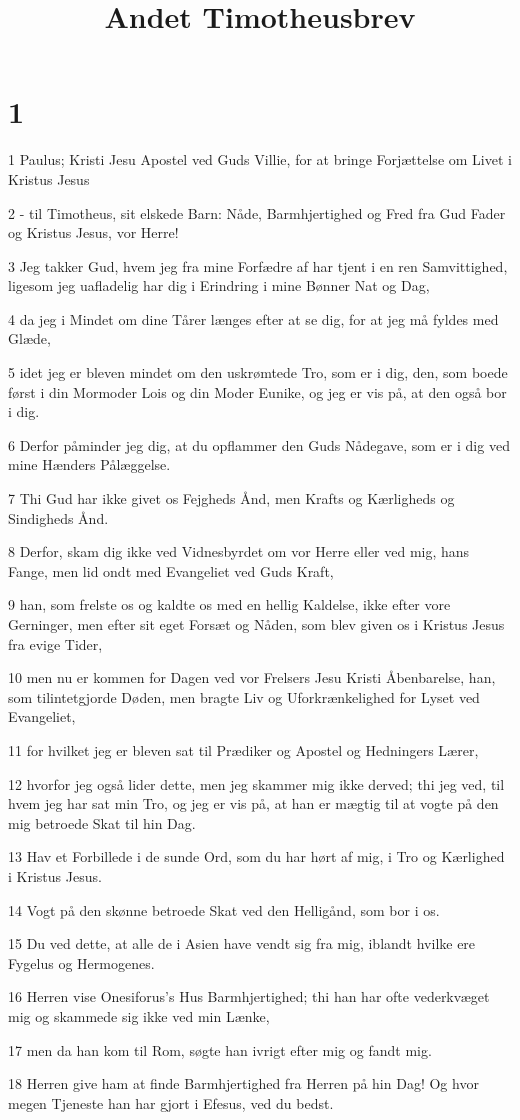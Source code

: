 

\title{Andet Timotheusbrev}


\chapter{1}

\par 1 Paulus; Kristi Jesu Apostel ved Guds Villie, for at bringe Forjættelse om Livet i Kristus Jesus
\par 2 - til Timotheus, sit elskede Barn: Nåde, Barmhjertighed og Fred fra Gud Fader og Kristus Jesus, vor Herre!
\par 3 Jeg takker Gud, hvem jeg fra mine Forfædre af har tjent i en ren Samvittighed, ligesom jeg uafladelig har dig i Erindring i mine Bønner Nat og Dag,
\par 4 da jeg i Mindet om dine Tårer længes efter at se dig, for at jeg må fyldes med Glæde,
\par 5 idet jeg er bleven mindet om den uskrømtede Tro, som er i dig, den, som boede først i din Mormoder Lois og din Moder Eunike, og jeg er vis på, at den også bor i dig.
\par 6 Derfor påminder jeg dig, at du opflammer den Guds Nådegave, som er i dig ved mine Hænders Pålæggelse.
\par 7 Thi Gud har ikke givet os Fejgheds Ånd, men Krafts og Kærligheds og Sindigheds Ånd.
\par 8 Derfor, skam dig ikke ved Vidnesbyrdet om vor Herre eller ved mig, hans Fange, men lid ondt med Evangeliet ved Guds Kraft,
\par 9 han, som frelste os og kaldte os med en hellig Kaldelse, ikke efter vore Gerninger, men efter sit eget Forsæt og Nåden, som blev given os i Kristus Jesus fra evige Tider,
\par 10 men nu er kommen for Dagen ved vor Frelsers Jesu Kristi Åbenbarelse, han, som tilintetgjorde Døden, men bragte Liv og Uforkrænkelighed for Lyset ved Evangeliet,
\par 11 for hvilket jeg er bleven sat til Prædiker og Apostel og Hedningers Lærer,
\par 12 hvorfor jeg også lider dette, men jeg skammer mig ikke derved; thi jeg ved, til hvem jeg har sat min Tro, og jeg er vis på, at han er mægtig til at vogte på den mig betroede Skat til hin Dag.
\par 13 Hav et Forbillede i de sunde Ord, som du har hørt af mig, i Tro og Kærlighed i Kristus Jesus.
\par 14 Vogt på den skønne betroede Skat ved den Helligånd, som bor i os.
\par 15 Du ved dette, at alle de i Asien have vendt sig fra mig, iblandt hvilke ere Fygelus og Hermogenes.
\par 16 Herren vise Onesiforus's Hus Barmhjertighed; thi han har ofte vederkvæget mig og skammede sig ikke ved min Lænke,
\par 17 men da han kom til Rom, søgte han ivrigt efter mig og fandt mig.
\par 18 Herren give ham at finde Barmhjertighed fra Herren på hin Dag! Og hvor megen Tjeneste han har gjort i Efesus, ved du bedst.

